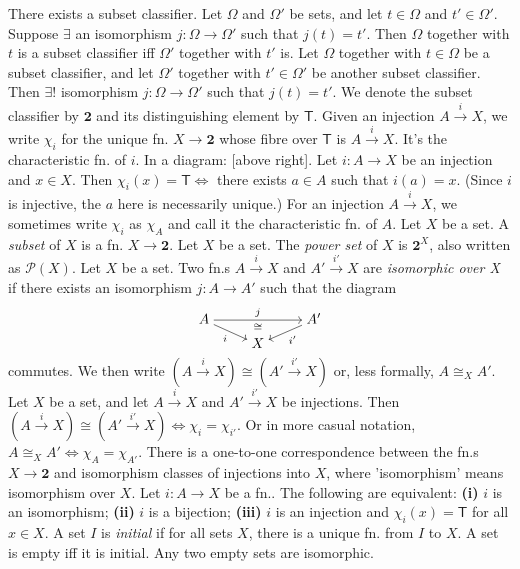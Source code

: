  There exists a subset classifier.
 Let $\Omega$ and $\Omega'$ be sets, and let $t \in \Omega$ and $t' \in \Omega'$. Suppose $\exists$ an isomorphism $j \colon \Omega \to \Omega'$ such that $j(t) = t'$. Then $\Omega$ together with $t$ is a subset classifier iff $\Omega'$ together with $t'$ is.
 Let $\Omega$ together with $t \in \Omega$ be a subset classifier, and let $\Omega'$ together with $t' \in \Omega'$ be another subset classifier. Then $\exists!$ isomorphism $j \colon \Omega \to \Omega'$ such that $j(t) = t'$.
 We denote the subset classifier by $\mathbf{2}$ and its distinguishing element by $\textsf{T}$. Given an injection $A \xrightarrow{i} X$, we write $\chi_i$ for the unique fn. $X \to \mathbf{2}$ whose fibre over $\mathsf{T}$ is $A \xrightarrow{i} X$. It's the characteristic fn. of $i$. In a diagram: [above right].
 Let $i \colon A \to X$ be an injection and $x \in X$. Then $\chi_i(x) = \mathsf{T} \iff$ there exists $a \in A$ such that $i(a) = x$. (Since $i$ is injective, the $a$ here is necessarily unique.)
 For an injection $A \xrightarrow{i} X$, we sometimes write $\chi_i$ as $\chi_A$ and call it the characteristic fn. of $A$.
 Let $X$ be a set. A \textit{subset} of $X$ is a fn. $X \to \mathbf{2}$.
 Let $X$ be a set. The \textit{power set} of $X$ is $\mathbf{2}^X$, also written as $\mathscr{P}(X)$.
 Let $X$ be a set. Two fn.s $A \xrightarrow{i} X$ and $A' \xrightarrow{i'} X$ are \textit{isomorphic over X} if there exists an isomorphism $j \colon A \to A'$ such that the diagram
\[\begin{tikzcd}[cramped,row sep=tiny]
    A && {A'} \\
    & X
    \arrow["j", "\cong"', from=1-1, to=1-3]
    \arrow["i"', from=1-1, to=2-2]
    \arrow["{i'}", from=1-3, to=2-2]
\end{tikzcd}\]
commutes. We then write $(A \xrightarrow{i} X) \cong (A' \xrightarrow{i'} X)$ or, less formally, $A \cong_X A'$.
 Let $X$ be a set, and let $A \xrightarrow{i} X$ and $A' \xrightarrow{i'} X$ be injections. Then $(A \xrightarrow{i} X) \cong (A' \xrightarrow{i'} X) \iff \chi_i = \chi_{i'}$. Or in more casual notation, $A \cong_X A' \iff \chi_A = \chi_{A'}$.
 There is a one-to-one correspondence between the fn.s $X \to \mathbf{2}$ and isomorphism classes of injections into $X$, where 'isomorphism' means isomorphism over $X$.
 Let $i \colon A \to X$ be a fn.. The following are equivalent: \textbf{(i)} $i$ is an isomorphism; \textbf{(ii)} $i$ is a bijection; \textbf{(iii)} $i$ is an injection and $\chi_i(x) = \mathsf{T}$ for all $x \in X$.
 A set $I$ is \textit{initial} if for all sets $X$, there is a unique fn. from $I$ to $X$.
 A set is empty iff it is initial.
 Any two empty sets are isomorphic.